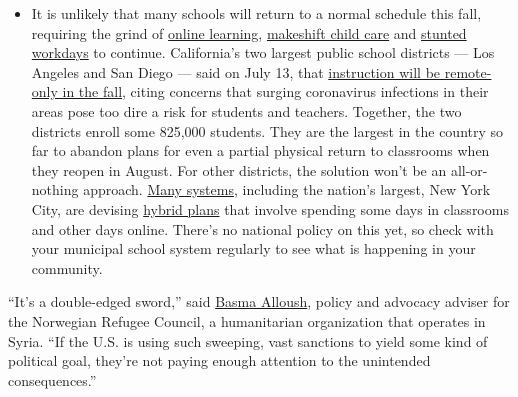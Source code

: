 \begin{itemize}
  \begin{itemize}
  \tightlist
  \item
    It is unlikely that many schools will return to a normal schedule
    this fall, requiring the grind of
    \href{https://www.nytimes.com/2020/06/05/us/coronavirus-education-lost-learning.html?action=click\&pgtype=Article\&state=default\&region=MAIN_CONTENT_3\&context=storylines_faq}{online
    learning},
    \href{https://www.nytimes.com/2020/05/29/us/coronavirus-child-care-centers.html?action=click\&pgtype=Article\&state=default\&region=MAIN_CONTENT_3\&context=storylines_faq}{makeshift
    child care} and
    \href{https://www.nytimes.com/2020/06/03/business/economy/coronavirus-working-women.html?action=click\&pgtype=Article\&state=default\&region=MAIN_CONTENT_3\&context=storylines_faq}{stunted
    workdays} to continue. California's two largest public school
    districts --- Los Angeles and San Diego --- said on July 13, that
    \href{https://www.nytimes.com/2020/07/13/us/lausd-san-diego-school-reopening.html?action=click\&pgtype=Article\&state=default\&region=MAIN_CONTENT_3\&context=storylines_faq}{instruction
    will be remote-only in the fall}, citing concerns that surging
    coronavirus infections in their areas pose too dire a risk for
    students and teachers. Together, the two districts enroll some
    825,000 students. They are the largest in the country so far to
    abandon plans for even a partial physical return to classrooms when
    they reopen in August. For other districts, the solution won't be an
    all-or-nothing approach.
    \href{https://bioethics.jhu.edu/research-and-outreach/projects/eschool-initiative/school-policy-tracker/}{Many
    systems}, including the nation's largest, New York City, are
    devising
    \href{https://www.nytimes.com/2020/06/26/us/coronavirus-schools-reopen-fall.html?action=click\&pgtype=Article\&state=default\&region=MAIN_CONTENT_3\&context=storylines_faq}{hybrid
    plans} that involve spending some days in classrooms and other days
    online. There's no national policy on this yet, so check with your
    municipal school system regularly to see what is happening in your
    community.
  \end{itemize}
\end{itemize}

``It's a double-edged sword,'' said
\href{https://www.mei.edu/experts/basma-alloush}{Basma Alloush}, policy
and advocacy adviser for the Norwegian Refugee Council, a humanitarian
organization that operates in Syria. ``If the U.S. is using such
sweeping, vast sanctions to yield some kind of political goal, they're
not paying enough attention to the unintended consequences.''

